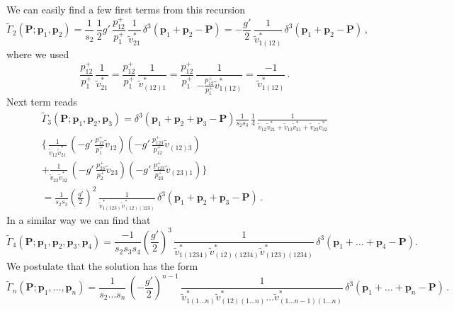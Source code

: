 \documentclass[english,american]{article}
\begin{document}
We can easily find a few first terms from this recursion
\begin{equation}
\tilde{\Gamma}_{2}\left(\mathbf{P};\mathbf{p}_{1},\mathbf{p}_{2}\right)=\frac{1}{s_{2}}\,\frac{1}{2}g'\,\frac{p_{12}^{+}}{p_{1}^{+}}\,\frac{1}{\tilde{v}_{21}^{*}}\,\delta^{3}\left(\mathbf{p}_{1}+\mathbf{p}_{2}-\mathbf{P}\right)=-\frac{g'}{2}\,\frac{1}{\tilde{v}_{1\left(12\right)}^{*}}\,\delta^{3}\left(\mathbf{p}_{1}+\mathbf{p}_{2}-\mathbf{P}\right)\,,
\end{equation}
where we used
\begin{equation}
\frac{p_{12}^{+}}{p_{1}^{+}}\,\frac{1}{\tilde{v}_{21}^{*}}=\frac{p_{12}^{+}}{p_{1}^{+}}\,\frac{1}{\tilde{v}_{\left(12\right)1}^{*}}=\frac{p_{12}^{+}}{p_{1}^{+}}\,\frac{1}{-\frac{p_{12}^{+}}{p_{1}^{+}}\tilde{v}_{1\left(12\right)}^{*}}=\frac{-1}{\tilde{v}_{1\left(12\right)}^{*}}\,.
\end{equation}
Next term reads
\begin{multline}
\tilde{\Gamma}_{3}\left(\mathbf{P};\mathbf{p}_{1},\mathbf{p}_{2},\mathbf{p}_{3}\right)=\delta^{3}\left(\mathbf{p}_{1}+\mathbf{p}_{2}+\mathbf{p}_{3}-\mathbf{P}\right)\frac{1}{s_{2}s_{3}}\,\frac{1}{4}\,\frac{1}{\tilde{v}_{12}\tilde{v}_{21}^{*}+\tilde{v}_{13}\tilde{v}_{31}^{*}+\tilde{v}_{23}\tilde{v}_{32}^{*}}\\
\Bigg\{\,\frac{1}{\tilde{v}_{12}\tilde{v}_{21}^{*}}\,\left(-g'\,\frac{p_{12}^{+}}{p_{1}^{+}}\tilde{v}_{12}\right)\left(-g'\,\frac{p_{123}^{+}}{p_{12}^{+}}\tilde{v}_{\left(12\right)3}\right)\\
+\frac{1}{\tilde{v}_{23}\tilde{v}_{32}^{*}}\,\left(-g'\,\frac{p_{23}^{+}}{p_{2}^{+}}\tilde{v}_{23}\right)\left(-g'\,\frac{p_{123}^{+}}{p_{23}^{+}}\tilde{v}_{\left(23\right)1}\right)\Bigg\}\\
=\frac{1}{s_{2}s_{3}}\left(\frac{g'}{2}\right)^{2}\,\frac{1}{\tilde{v}_{1\left(123\right)}^{*}\tilde{v}_{\left(12\right)\left(123\right)}^{*}}\,\delta^{3}\left(\mathbf{p}_{1}+\mathbf{p}_{2}+\mathbf{p}_{3}-\mathbf{P}\right)\,.
\end{multline}
In a similar way we can find that
\begin{equation}
\tilde{\Gamma}_{4}\left(\mathbf{P};\mathbf{p}_{1},\mathbf{p}_{2},\mathbf{p}_{3},\mathbf{p}_{4}\right)=\frac{-1}{s_{2}s_{3}s_{4}}\left(\frac{g'}{2}\right)^{3}\,\frac{1}{\tilde{v}_{1\left(1234\right)}^{*}\tilde{v}_{\left(12\right)\left(1234\right)}^{*}\tilde{v}_{\left(123\right)\left(1234\right)}^{*}}\,\delta^{3}\left(\mathbf{p}_{1}+\dots+\mathbf{p}_{4}-\mathbf{P}\right).
\end{equation}
We postulate that the solution has the form
\begin{equation}
\tilde{\Gamma}_{n}\left(\mathbf{P};\mathbf{p}_{1},\dots,\mathbf{p}_{n}\right)=\frac{1}{s_{2}\dots s_{n}}\,\left(-\frac{g'}{2}\right)^{n-1}\,\frac{1}{\tilde{v}_{1\left(1\dots n\right)}^{*}\tilde{v}_{\left(12\right)\left(1\dots n\right)}^{*}\dots\tilde{v}_{\left(1\dots n-1\right)\left(1\dots n\right)}^{*}}\,\delta^{3}\left(\mathbf{p}_{1}+\dots+\mathbf{p}_{n}-\mathbf{P}\right)\,.\label{eq:Gamma_n_sol}
\end{equation}
\end{document}
